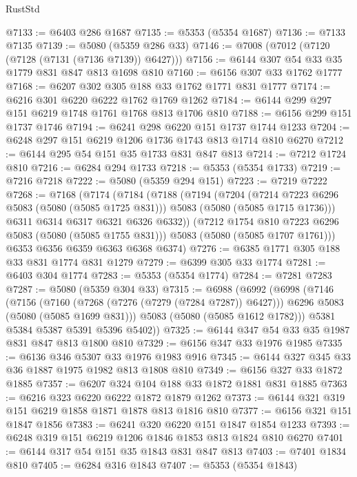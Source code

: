 \begin{lexlean}{RustStd}
\begin{coremodule}
@7133 := @6403 @286 @1687
@7135 := @5353 (@5354 @1687)
@7136 := @7133 @7135
@7139 := @5080 (@5359 @286 @33)
@7146 := @7008 (@7012 (@7120 (@7128 (@7131 (@7136 @7139)) @6427)))
@7156 := @6144 @307 @54 @33 @35 @1779 @831 @847 @813 @1698 @810
@7160 := @6156 @307 @33 @1762 @1777
@7168 := @6207 @302 @305 @188 @33 @1762 @1771 @831 @1777
@7174 := @6216 @301 @6220 @6222 @1762 @1769 @1262
@7184 := @6144 @299 @297 @151 @6219 @1748 @1761 @1768 @813 @1706 @810
@7188 := @6156 @299 @151 @1737 @1746
@7194 := @6241 @298 @6220 @151 @1737 @1744 @1233
@7204 := @6248 @297 @151 @6219 @1206 @1736 @1743 @813 @1714 @810 @6270
@7212 := @6144 @295 @54 @151 @35 @1733 @831 @847 @813
@7214 := @7212 @1724 @810
@7216 := @6284 @294 @1733
@7218 := @5353 (@5354 @1733)
@7219 := @7216 @7218
@7222 := @5080 (@5359 @294 @151)
@7223 := @7219 @7222
@7268 := @7168
    (@7174
      (@7184
        (@7188
          (@7194
            (@7204
              (@7214 @7223 @6296 @5083 (@5080 (@5085 @1725 @831)))
              @5083
              (@5080 (@5085 @1715 @1736)))
            @6311
            @6314
            @6317
            @6321
            @6326
            @6332))
        (@7212 @1754 @810 @7223 @6296 @5083 (@5080 (@5085 @1755 @831)))
        @5083
        (@5080 (@5085 @1707 @1761)))
      @6353
      @6356
      @6359
      @6363
      @6368
      @6374)
@7276 := @6385 @1771 @305 @188 @33 @831 @1774 @831 @1279
@7279 := @6399 @305 @33 @1774
@7281 := @6403 @304 @1774
@7283 := @5353 (@5354 @1774)
@7284 := @7281 @7283
@7287 := @5080 (@5359 @304 @33)
@7315 := @6988
    (@6992
      (@6998
        (@7146
          (@7156
            (@7160 (@7268 (@7276 (@7279 (@7284 @7287)) @6427)))
            @6296
            @5083
            (@5080 (@5085 @1699 @831)))
          @5083
          (@5080 (@5085 @1612 @1782)))
        @5381
        @5384
        @5387
        @5391
        @5396
        @5402))
@7325 := @6144 @347 @54 @33 @35 @1987 @831 @847 @813 @1800 @810
@7329 := @6156 @347 @33 @1976 @1985
@7335 := @6136 @346 @5307 @33 @1976 @1983 @916
@7345 := @6144 @327 @345 @33 @36 @1887 @1975 @1982 @813 @1808 @810
@7349 := @6156 @327 @33 @1872 @1885
@7357 := @6207 @324 @104 @188 @33 @1872 @1881 @831 @1885
@7363 := @6216 @323 @6220 @6222 @1872 @1879 @1262
@7373 := @6144 @321 @319 @151 @6219 @1858 @1871 @1878 @813 @1816 @810
@7377 := @6156 @321 @151 @1847 @1856
@7383 := @6241 @320 @6220 @151 @1847 @1854 @1233
@7393 := @6248 @319 @151 @6219 @1206 @1846 @1853 @813 @1824 @810 @6270
@7401 := @6144 @317 @54 @151 @35 @1843 @831 @847 @813
@7403 := @7401 @1834 @810
@7405 := @6284 @316 @1843
@7407 := @5353 (@5354 @1843)

\end{coremodule}
\end{lexlean}
